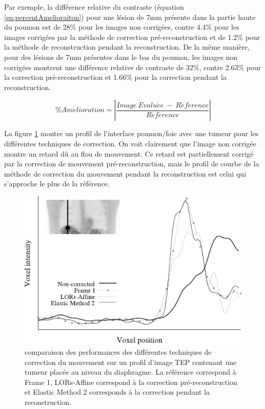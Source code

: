 Par exemple, la différence relative du contraste (équation \ref{eq:percentAmelioraiton}) pour une lésion de 7mm présente dans la partie haute du poumon est de 28\% pour les images non corrigées, contre 4.4\% pour les images corrigées par la méthode de correction pré-reconstruction et de 1.2\% pour la méthode de reconstruction pendant la reconstruction. De la même manière, pour des lésions de 7mm présentes dans le bas du poumon, les images non corrigées montrent une différence relative de contraste de 32\%, contre 2.63\% pour la correction pré-reconstruction et 1.66\% pour la correction pendant la reconstruction.


\begin{equation}
 \label{eq:percentAmelioraiton}
 \% Am\acute{e}lioration = \left| \frac{Image~\acute{E}valu\acute{e}e~-~R\acute{e}f\acute{e}rence}{R\acute{e}f\acute{e}rence} \right|
\end{equation}

La figure \ref{fig:lamare2007} montre un profil de l'interface poumon/foie avec une tumeur pour les différentes techniques de correction. On voit clairement que l'image non corrigée montre un retard dû au flou de mouvement. Ce retard est partiellement corrigé par la correction de mouvement pré-reconstruction, mais le profil de courbe de la méthode de correction du mouvement pendant la reconstruction est celui qui s'approche le plus de la référence.


\begin{figure}[h!]
	\begin{center}
		\includegraphics[width=12cm]{images/lamare2007list}
	\end{center}
	\caption{comparaison des performances des différentes techniques de correction du mouvement sur un profil d'image TEP contenant une tumeur placée au niveau du diaphragme. La référence correspond à Frame 1, LORs-Affine correspond à la correction pré-reconstruction et Elastic Method 2 corresponds à la correction pendant la reconstruction.} 
	\label{fig:lamare2007}
\end{figure}


